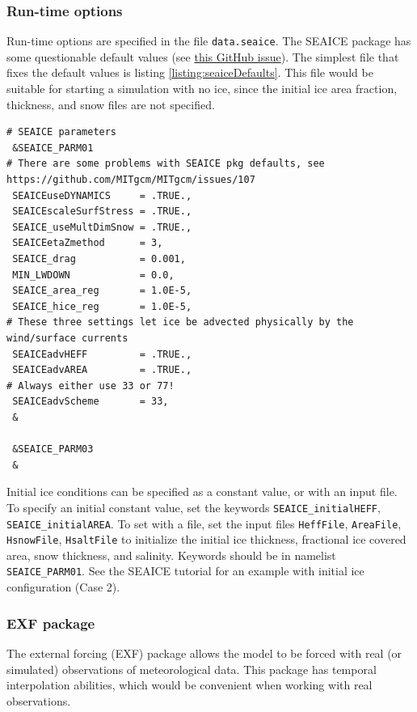 \documentclass[11pt]{article}
\begin{document}
\subsubsection*{Run-time options}
Run-time options are specified in the file \verb|data.seaice|. The SEAICE package has some questionable default values (see \href{https://github.com/MITgcm/MITgcm/issues/107}{this GitHub issue}). The simplest file that fixes the default values is listing \ref{listing:seaiceDefaults}. This file would be suitable for starting a simulation with no ice, since the initial ice area fraction, thickness, and snow files are not specified.

\begin{lstlisting}[caption={Recommended parameters for data.seaice file}, label={listing:seaiceDefaults}]
# SEAICE parameters
 &SEAICE_PARM01
# There are some problems with SEAICE pkg defaults, see https://github.com/MITgcm/MITgcm/issues/107
 SEAICEuseDYNAMICS     = .TRUE.,
 SEAICEscaleSurfStress = .TRUE.,
 SEAICE_useMultDimSnow = .TRUE.,
 SEAICEetaZmethod      = 3,
 SEAICE_drag           = 0.001,
 MIN_LWDOWN            = 0.0,
 SEAICE_area_reg       = 1.0E-5,
 SEAICE_hice_reg       = 1.0E-5,
# These three settings let ice be advected physically by the wind/surface currents
 SEAICEadvHEFF         = .TRUE.,
 SEAICEadvAREA         = .TRUE.,
# Always either use 33 or 77!
 SEAICEadvScheme       = 33,
 &

 &SEAICE_PARM03
 &
\end{lstlisting}

Initial ice conditions can be specified as a constant value, or with an input file. To specify an initial constant value, set the keywords \verb|SEAICE_initialHEFF|, \verb|SEAICE_initialAREA|. To set with a file, set the input files \verb|HeffFile|, \verb|AreaFile|, \verb|HsnowFile|, \verb|HsaltFile| to initialize the initial ice thickness, fractional ice covered area, snow thickness, and salinity. Keywords should be in namelist \verb|SEAICE_PARM01|. See the SEAICE tutorial for an example with initial ice configuration (Case 2).

\subsubsection{EXF package}
\label{sec:EXF}
The external forcing (EXF) package allows the model to be forced with real (or simulated) observations of meteorological data. This package has temporal interpolation abilities, which would be convenient when working with real observations.
\end{document}
